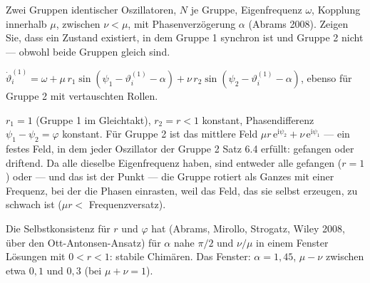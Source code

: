 \begin{aufgabe}
Zwei Gruppen identischer Oszillatoren, $N$ je Gruppe, Eigenfrequenz $\omega$, Kopplung innerhalb $\mu$, zwischen $\nu < \mu$, mit Phasenverzögerung $\alpha$ (Abrams 2008). Zeigen Sie, dass ein Zustand existiert, in dem Gruppe 1 synchron ist und Gruppe 2 nicht --- obwohl beide Gruppen gleich sind.

\loesung
{}
$\dot\vartheta_i^{(1)} = \omega + \mu\,r_1\sin(\psi_1 - \vartheta_i^{(1)} - \alpha) + \nu\,r_2\sin(\psi_2 - \vartheta_i^{(1)} - \alpha)$, ebenso für Gruppe 2 mit vertauschten Rollen.

$r_1 = 1$ (Gruppe 1 im Gleichtakt), $r_2 = r < 1$ konstant, Phasendifferenz $\psi_1 - \psi_2 = \varphi$ konstant. Für Gruppe 2 ist das mittlere Feld $\mu r\,\mathrm e^{\mathrm i\psi_2} + \nu\,\mathrm e^{\mathrm i\psi_1}$ --- ein festes Feld, in dem jeder Oszillator der Gruppe 2 Satz 6.4 erfüllt: gefangen oder driftend. Da alle dieselbe Eigenfrequenz haben, sind entweder alle gefangen ($r = 1$) oder --- und das ist der Punkt --- die Gruppe rotiert als Ganzes mit einer Frequenz, bei der die Phasen  einrasten, weil das Feld, das sie selbst erzeugen, zu schwach ist ($\mu r < $ Frequenzversatz).

Die Selbstkonsistenz für $r$ und $\varphi$ hat (Abrams, Mirollo, Strogatz, Wiley 2008, über den Ott-Antonsen-Ansatz) für $\alpha$ nahe $\pi/2$ und $\nu/\mu$ in einem Fenster Lösungen mit $0 < r < 1$: stabile Chimären. Das Fenster: $\alpha = 1{,}45$, $\mu - \nu$ zwischen etwa $0{,}1$ und $0{,}3$ (bei $\mu + \nu = 1$).

\begin{center}
\begin{minipage}{0.88\textwidth}
\end{minipage}
\end{center}
\end{aufgabe}

